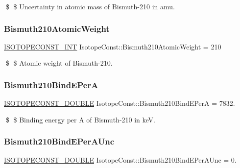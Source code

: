 \$ \$ Uncertainty in atomic mass of Bismuth-\/210 in amu. \mbox{\label{group___isotope_const-_bismuth-_bi210_gaab0934b4b5501a578c6172654f048c0f}} 
\subsubsection{\texorpdfstring{Bismuth210\+Atomic\+Weight}{Bismuth210AtomicWeight}}
{\footnotesize\ttfamily \mbox{\hyperlink{group___isotope_const-_macros_ga5f18360b3e99483a35c32d789e62621c}{I\+S\+O\+T\+O\+P\+E\+C\+O\+N\+S\+T\+\_\+\+I\+NT}} Isotope\+Const\+::\+Bismuth210\+Atomic\+Weight = 210}

\$ \$ Atomic weight of Bismuth-\/210. \mbox{\label{group___isotope_const-_bismuth-_bi210_ga3ea677ff74e6de5ad874be0bbfbea67b}} 
\subsubsection{\texorpdfstring{Bismuth210\+Bind\+E\+PerA}{Bismuth210BindEPerA}}
{\footnotesize\ttfamily \mbox{\hyperlink{group___isotope_const-_macros_ga8f45a7272ce02c0b4c65c44636ed719a}{I\+S\+O\+T\+O\+P\+E\+C\+O\+N\+S\+T\+\_\+\+D\+O\+U\+B\+LE}} Isotope\+Const\+::\+Bismuth210\+Bind\+E\+PerA = 7832.}

\$ \$ Binding energy per A of Bismuth-\/210 in keV. \mbox{\label{group___isotope_const-_bismuth-_bi210_ga4261a06eefd74c30cf753d611900d740}} 
\subsubsection{\texorpdfstring{Bismuth210\+Bind\+E\+Per\+A\+Unc}{Bismuth210BindEPerAUnc}}
{\footnotesize\ttfamily \mbox{\hyperlink{group___isotope_const-_macros_ga8f45a7272ce02c0b4c65c44636ed719a}{I\+S\+O\+T\+O\+P\+E\+C\+O\+N\+S\+T\+\_\+\+D\+O\+U\+B\+LE}} Isotope\+Const\+::\+Bismuth210\+Bind\+E\+Per\+A\+Unc = 0.}

